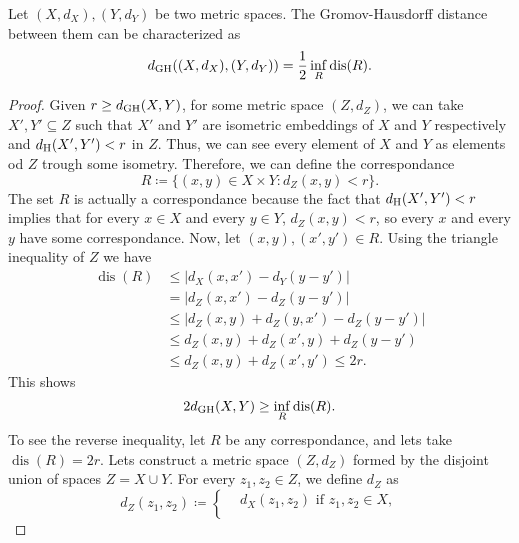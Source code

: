 \begin{proposition} \label{prop:gh-characterization}
    Let $ (X, d_X), (Y, d_Y) $ be two metric spaces. The Gromov-Hausdorff distance between them can be characterized as
    \begin{equation}
        d_{\operatorname{GH}}((X, d_X), (Y, d_Y)) = \frac{1}{2} \inf_{R} \operatorname{dis}(R).   
    \end{equation}
\end{proposition}
\begin{proof}
    Given $ r \geq d_{\operatorname{GH}}(X, Y) $, for some metric space $(Z, d_Z)$, we can take $ X', Y' \subseteq Z $ such that $ X' $ and $ Y' $ are isometric embeddings of $ X $ and $ Y $ respectively and $ d_{\operatorname{H}}(X', Y') < r $ in $ Z $. Thus, we can see every element of $ X $ and $ Y $ as elements od $ Z $ trough some isometry. Therefore, we can define the correspondance
    \begin{equation}
        R \coloneq \{(x, y) \in X \times Y \colon d_Z(x, y) < r\}.
    \end{equation}
    The set $ R $ is actually a correspondance because the fact that $ d_{\operatorname{H}}(X', Y') < r $ implies that for every $ x \in X $ and every $ y \in Y $, $ d_Z(x, y) < r $, so every $ x $ and every $ y $ have some correspondance. Now, let $ (x, y), (x', y') \in R $. Using the triangle inequality of $ Z $ we have
    \begin{align}
        \operatorname{dis}(R) &\leq |d_X(x, x') - d_Y(y - y')| \\
        &= |d_Z(x, x') - d_Z(y - y')| \\
        &\leq |d_Z(x, y) + d_Z(y, x') - d_Z(y - y')| \\
        &\leq d_Z(x, y) + d_Z(x', y) + d_Z(y - y') \\
        &\leq d_Z(x, y) + d_Z(x', y') \leq 2r.
    \end{align}
    This shows
    \begin{equation}
        2 d_{\operatorname{GH}}(X, Y) \geq \inf_{R} \operatorname{dis}(R).
    \end{equation}
    To see the reverse inequality, let $ R $ be any correspondance, and lets take $ \operatorname{dis}(R) = 2r $. Lets construct a metric space $ (Z, d_Z) $ formed by the disjoint union of spaces $ Z = X \cup Y $. For every $ z_1, z_2 \in Z $, we define $ d_Z $ as
    \begin{equation}
        d_Z(z_1, z_2) \coloneq \begin{cases}
            &d_X(z_1, z_2) \text{ if } z_1, z_2 \in X, \\

\end{cases}
\end{equation}
\end{proof}
